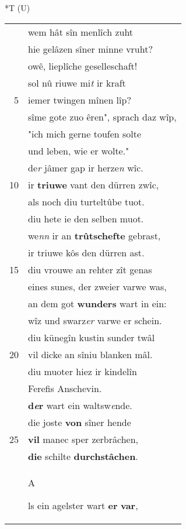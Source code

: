 \documentclass[8pt,a4paper,notitlepage]{article}
\begin{document}
\begin{table}[ht]
\begin{minipage}[t]{0.5\linewidth}
\end{minipage}
\hspace{0.5cm}
\begin{minipage}[t]{0.5\linewidth}
\small
\begin{center}*T (U)
\end{center}
\begin{tabular}{rl}
 & wem hât sîn menlîch zuht\\ 
 & hie gelâzen sîner minne vruht?\\ 
 & owê, lieplîche geselleschaft!\\ 
 & sol nû riuwe mi\textit{t} ir kraft\\ 
5 & iemer twingen mînen lîp?\\ 
 & sîme gote zuo êren", sprach daz wîp,\\ 
 & "ich mich gerne toufen solte\\ 
 & und leben, wie er wolte."\\ 
 & de\textit{r} jâmer gap ir herze\textit{n} wîc.\\ 
10 & ir \textbf{triuwe} vant den dürren zwîc,\\ 
 & als noch diu turteltûbe tuot.\\ 
 & diu hete ie den selben muot.\\ 
 & we\textit{nn} ir an \textbf{trûtschefte} gebrast,\\ 
 & ir triuwe kôs den dürren ast.\\ 
15 & diu vrouwe an rehter zît genas\\ 
 & eines sunes, der zweier varwe was,\\ 
 & an dem got \textbf{wunders} wart in ein:\\ 
 & wîz und swarz\textit{er} varwe er schein.\\ 
 & diu künegîn kustin sunder twâl\\ 
20 & vil dicke an sîniu blanken mâl.\\ 
 & diu muoter hiez ir kindelîn\\ 
 & Ferefis Anschevin.\\ 
 & \textbf{d\textit{e}r} wart ein waltsw\textit{e}nde.\\ 
 & die joste \textbf{von} sîner hende\\ 
25 & \textbf{vil} manec sper zerbrâchen,\\ 
 & \textbf{die} schilte \textbf{durchstâchen}.\\ 
 & \begin{large}A\end{large}ls ein agelster wart \textbf{er} \textbf{var},\\ 

\end{tabular}
\end{minipage}
\end{table}
\end{document}

